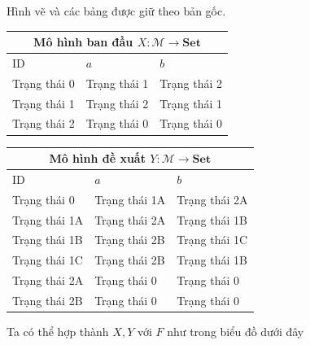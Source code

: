 \begin{center}\ctfiveMachineX\quad\ctfiveMachineY\end{center}
\noindent Hình vẽ và các bảng được giữ theo bản gốc.
\begin{center}\footnotesize\setlength{\tabcolsep}{3pt}
\begin{tabular}{|l|l|l|}\hline\multicolumn{3}{|c|}{Mô hình ban đầu $X:\mathcal M\to\mathbf{Set}$}\\\hline ID&$a$&$b$\\\hline Trạng thái 0&Trạng thái 1&Trạng thái 2\\Trạng thái 1&Trạng thái 2&Trạng thái 1\\Trạng thái 2&Trạng thái 0&Trạng thái 0\\\hline\end{tabular}\quad
\begin{tabular}{|l|l|l|}\hline\multicolumn{3}{|c|}{Mô hình đề xuất $Y:\mathcal M\to\mathbf{Set}$}\\\hline ID&$a$&$b$\\\hline Trạng thái 0&Trạng thái 1A&Trạng thái 2A\\Trạng thái 1A&Trạng thái 2A&Trạng thái 1B\\Trạng thái 1B&Trạng thái 2B&Trạng thái 1C\\Trạng thái 1C&Trạng thái 2B&Trạng thái 1B\\Trạng thái 2A&Trạng thái 0&Trạng thái 0\\Trạng thái 2B&Trạng thái 0&Trạng thái 0\\\hline\end{tabular}
\end{center}
Ta có thể hợp thành $X,Y$ với $F$ như trong biểu đồ dưới đây
\begin{center}\end{center}
